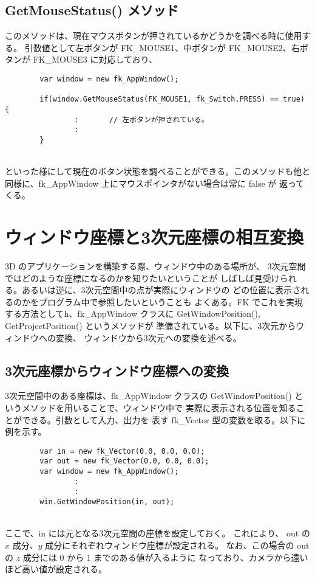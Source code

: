 \subsection{GetMouseStatus() メソッド}
このメソッドは、現在マウスボタンが押されているかどうかを調べる時に使用する。
引数値として左ボタンが FK\_MOUSE1、中ボタンが FK\_MOUSE2、右ボタンが
FK\_MOUSE3 に対応しており、
\\
\begin{breakbox}
\begin{verbatim}
        var window = new fk_AppWindow();

        if(window.GetMouseStatus(FK_MOUSE1, fk_Switch.PRESS) == true) {
                :       // 左ボタンが押されている。
                :
        }
\end{verbatim}
\end{breakbox}
~ \\
といった様にして現在のボタン状態を調べることができる。このメソッドも他と
同様に、fk\_AppWindow 上にマウスポインタがない場合は常に false が
返ってくる。

\section{ウィンドウ座標と3次元座標の相互変換} \label{sec:coordinate}
3D のアプリケーションを構築する際、ウィンドウ中のある場所が、
3次元空間ではどのような座標になるのかを知りたいということが
しばしば見受けられる。あるいは逆に、3次元空間中の点が実際にウィンドウの
どの位置に表示されるのかをプログラム中で参照したいということも
よくある。FK でこれを実現する方法としてh、fk\_AppWindow クラスに
GetWindowPosition(), GetProjectPosition() というメソッドが
準備されている。以下に、3次元からウィンドウへの変換、
ウィンドウから3次元への変換を述べる。

\subsection{3次元座標からウィンドウ座標への変換}
3次元空間中のある座標は、fk\_AppWindow クラスの
GetWindowPosition() というメソッドを用いることで、ウィンドウ中で
実際に表示される位置を知ることができる。引数として入力、出力を
表す fk\_Vector 型の変数を取る。以下に例を示す。
\\
\begin{breakbox}
\begin{verbatim}
        var in = new fk_Vector(0.0, 0.0, 0.0);
        var out = new fk_Vector(0.0, 0.0, 0.0);
        var window = new fk_AppWindow();
                :
                :
        win.GetWindowPosition(in, out);
\end{verbatim}
\end{breakbox}
~ \\
ここで、in には元となる3次元空間の座標を設定しておく。
これにより、
out の \(x\) 成分、\(y\) 成分にそれぞれウィンドウ座標が設定される。
なお、この場合の out の \(z\) 成分には 0 から 1 までのある値が入るように
なっており、カメラから遠いほど高い値が設定される。

